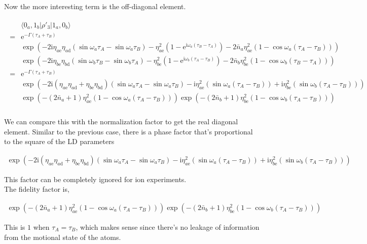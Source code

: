 \documentclass[10pt,fleqn]{article}
\newcommand{\ue}{\mathrm{e}}
\newcommand{\ui}{\mathrm{i}}
\newcommand{\eqar}[1]
{
  \begin{align}
    #1
  \end{align}
}
\newcommand{\paren}[1]{{\left({#1}\right)}}
\begin{document}
Now the more interesting term is the off-diagonal element.
\eqar{
  \begin{split}
    &\langle0_a,1_b|\rho'_3|1_a,0_b\rangle\\
    =&\ue^{-\Gamma\paren{\tau_A+\tau_B}}\\
    &\exp\paren{
      -2\ui\eta_{a\mathrm{e}}
      \eta_{a\mathrm{d}}\paren{\sin\omega_a\tau_{A}-\sin\omega_a\tau_{B}}
      -\eta_{a\mathrm{e}}^2\paren{1-\ue^{\ui\omega_a\paren{\tau_{B}-\tau_{A}}}}
      -2{\bar n_a}\eta_{a\mathrm{e}}^2\paren{1-\cos\omega_a\paren{\tau_{A}-\tau_{B}}}
      }\\
    &\exp\paren{
      -2\ui\eta_{b\mathrm{e}}
      \eta_{b\mathrm{d}}\paren{\sin\omega_b\tau_{B}-\sin\omega_b\tau_{A}}
      -\eta_{b\mathrm{e}}^2\paren{1-\ue^{\ui\omega_b\paren{\tau_{A}-\tau_{B}}}}
      -2{\bar n_b}\eta_{b\mathrm{e}}^2\paren{1-\cos\omega_b\paren{\tau_{B}-\tau_{A}}}
      }\\
    =&\ue^{-\Gamma\paren{\tau_A+\tau_B}}\\
    &\exp\paren{
      -2\ui\paren{\eta_{a\mathrm{e}}\eta_{a\mathrm{d}}+\eta_{b\mathrm{e}}\eta_{b\mathrm{d}}}
      \paren{\sin\omega_a\tau_{A}-\sin\omega_a\tau_{B}}
      -\ui\eta_{a\mathrm{e}}^2\paren{\sin\omega_a\paren{\tau_{A}-\tau_{B}}}
      +\ui\eta_{b\mathrm{e}}^2\paren{\sin\omega_b\paren{\tau_{A}-\tau_{B}}}
      }\\
    &\exp\paren{
      -\paren{2{\bar n_a}+1}\eta_{a\mathrm{e}}^2\paren{1-\cos\omega_a\paren{\tau_{A}-\tau_{B}}}
      }
      \exp\paren{
      -\paren{2{\bar n_b}+1}\eta_{b\mathrm{e}}^2\paren{1-\cos\omega_b\paren{\tau_{A}-\tau_{B}}}
      }\\
  \end{split}
}
We can compare this with the normalization factor to get the real diagonal element.
Similar to the previous case, there is a phase factor that's proportional
to the square of the LD parameters
\eqar{
  \exp\paren{
    -2\ui\paren{\eta_{a\mathrm{e}}\eta_{a\mathrm{d}}+\eta_{b\mathrm{e}}\eta_{b\mathrm{d}}}
    \paren{\sin\omega_a\tau_{A}-\sin\omega_a\tau_{B}}
    -\ui\eta_{a\mathrm{e}}^2\paren{\sin\omega_a\paren{\tau_{A}-\tau_{B}}}
    +\ui\eta_{b\mathrm{e}}^2\paren{\sin\omega_b\paren{\tau_{A}-\tau_{B}}}
  }
}
This factor can be completely ignored for ion experiments.\\

The fidelity factor is,
\eqar{
  \exp\paren{
    -\paren{2{\bar n_a}+1}\eta_{a\mathrm{e}}^2\paren{1-\cos\omega_a\paren{\tau_{A}-\tau_{B}}}
  }
  \exp\paren{
    -\paren{2{\bar n_b}+1}\eta_{b\mathrm{e}}^2\paren{1-\cos\omega_b\paren{\tau_{A}-\tau_{B}}}
  }
}
This is $1$ when $\tau_A=\tau_B$, which makes sense since there's no leakage of
information from the motional state of the atoms.
\end{document}

